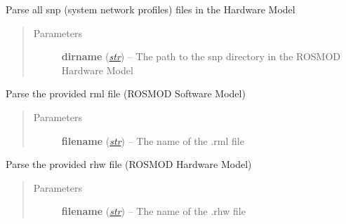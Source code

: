 \documentclass[letterpaper,10pt,english]{sphinxmanual}
\begin{document}
\begin{fulllineitems}
\begin{fulllineitems}
\begin{quote}
\begin{description}
\end{description}\end{quote}

\end{fulllineitems}


\begin{fulllineitems}
\label{class_Project:ROSMOD_Project.parse_snp}
Parse all snp (system network profiles) files in the Hardware Model
\begin{quote}\begin{description}
\item[{Parameters}] \leavevmode
\textbf{dirname} (\href{http://docs.python.org/library/functions.html\#str}{\emph{str}}) -- The path to the snp directory in the ROSMOD Hardware Model

\end{description}\end{quote}

\end{fulllineitems}


\begin{fulllineitems}
\label{class_Project:ROSMOD_Project.parse_rml}
Parse the provided rml file (ROSMOD Software Model)
\begin{quote}\begin{description}
\item[{Parameters}] \leavevmode
\textbf{filename} (\href{http://docs.python.org/library/functions.html\#str}{\emph{str}}) -- The name of the .rml file

\end{description}\end{quote}

\end{fulllineitems}


\begin{fulllineitems}
\label{class_Project:ROSMOD_Project.parse_rhw}
Parse the provided rhw file (ROSMOD Hardware Model)
\begin{quote}\begin{description}
\item[{Parameters}] \leavevmode
\textbf{filename} (\href{http://docs.python.org/library/functions.html\#str}{\emph{str}}) -- The name of the .rhw file


\end{description}
\end{quote}
\end{fulllineitems}
\end{fulllineitems}
\end{document}
